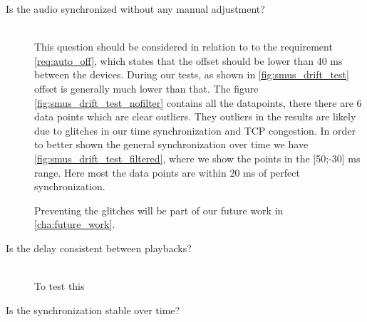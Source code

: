 \begin{description}
    \item[Is the audio synchronized without any manual adjustment?] \hfill \\
        This question should be considered in relation to to the requirement \vref{req:auto_off}, which states that the offset should be lower than 40 ms between the devices.
        During our tests, as shown in \vref{fig:smus_drift_test} offset is generally much lower than that.
        The figure \vref{fig:smus_drift_test_nofilter} contains all the datapoints, there there are 6 data points which are clear outliers.
        They outliers in the results are likely due to glitches in our time synchronization and TCP congestion.
        In order to better shown the general synchronization over time we have \vref{fig:smus_drift_test_filtered}, where we show the points in the [50;-30] ms range.
        Here most the data points are within $20$ ms of perfect synchronization.

        Preventing the glitches will be part of our future work in \vref{cha:future_work}.

    \item[Is the delay consistent between playbacks?] \hfill \\
        To test this 

    \item[Is the synchronization stable over time?] \hfill \\



\end{description}
